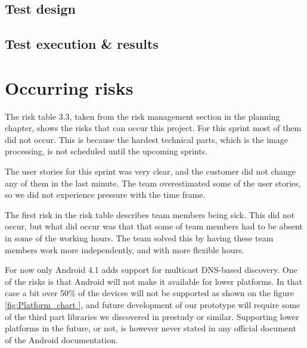 \subsection{Test design}
\subsection{Test execution \& results}

\section{Occurring risks}
The risk table 3.3, taken from the risk management section in the planning chapter, shows the risks that can occur this project. 
For this sprint most of them did not occur. 
This is because the hardest technical parts, which is the image processing, is not scheduled until the upcoming sprints. 

The user stories for this sprint was very clear, and the customer did not change any of them in the last minute. The team overestimated some of the user stories, so we did not experience pressure with the time frame. 

The first risk in the risk table describes team members being sick. This did not occur, but what did occur was that that some of team members had to be absent in some of the working hours. 
The team solved this by having these team members work more independently, and with more flexible hours.  

For now only Android 4.1 adds support for multicast DNS-based discovery.
One of the risks is that Android will not make it available for lower platforms.
In that case a bit over 50\% of the devices will not be supported as shown on the figure \ref{fig:Platform_chart }, and future development of our prototype will require some of the third part libraries we discovered in prestudy or similar.
Supporting lower platforms in the future, or not, is however never stated in any official document of the Android documentation.

